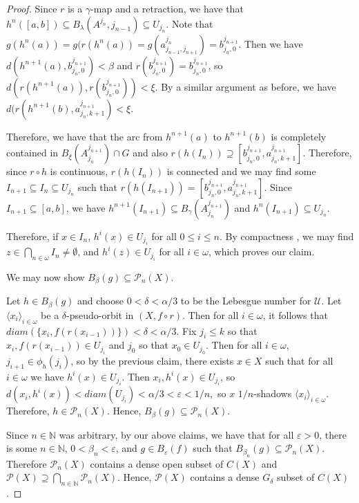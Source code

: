 \documentclass{amsart}
\numberwithin{equation}{section}
\begin{document}
\begin{proof}
Since $r$ is a $\gamma$-map and a retraction, we have that $h^n([a,b])\subseteq B_\lambda(A^{j_n},{j_{n-1}})\subseteq U_{j_n}$. Note that $g(h^n(a))= g(r(h^n(a))= g(a^{j_n}_{j_{n-1}, j_{n+1}})= b^{j_{n+1}}_{j_{n},0}.$ Then we have $d(h^{n+1}(a), b^{j_{n+1}}_{j_{n},0})<\beta$ and $r(b^{j_{n+1}}_{j_{n},0})=b^{j_{n+1}}_{j_{n},0}$, so $d(r(h^{n+1}(a)),r(b^{j_{n+1}}_{j_{n},0}))<\xi$. By a similar argument as before, we have $d(r(h^{n+1}(b), a^{j_{n+1}}_{j_{n},k+1})<\xi.$ 

Therefore, we have that the arc from $h^{n+1}(a)$ to $h^{n+1}(b)$ is completely contained in $B_\xi (A^{j_{n+1}}_{j_n})\cap G$ and also $r(h(I_n))\supseteq [b^{j_{n+1}}_{j_{n},0},a^{j_{n+1}}_{j_{n},k+1}]$. Therefore, since $r\circ h$ is continuous, $r(h(I_n))$ is connected and we may find some $I_{n+1}\subseteq I_n\subseteq U_{j_n}$ such that $r(h(I_{n+1}))= [b^{j_{n+1}}_{j_{n},0},a^{j_{n+1}}_{j_{n},k+1}]$. Since $I_{n+1}\subseteq[a,b]$, we have $h^{n+1}(I_{n+1})\subseteq B_\gamma(A^{j_{n+1}}_{j_n})$ and $h^n(I_{n+1})\subseteq U_{j_n}.$


Therefore, if $x\in I_n$, $h^i(x)\in U_{j_i}$ for all $0\leq i\leq n$. By compactness , we may find $z\in \bigcap_{n\in \omega}I_n \neq \emptyset$, and $h^i(z)\in U_{j_i} $ for all $i\in \omega$, which proves our claim. 


We may now show $B_\beta(g)\subseteq \mathcal{P}_n(X)$.

Let $h\in B_\beta(g)$ and choose $0<\delta<\alpha/3$ to be the Lebesgue number for $\mathcal{U}$. Let $\langle x_i \rangle _{i\in \omega}$ be a $\delta$-pseudo-orbit in $(X,f\circ r)$. Then for all $i\in \omega$, it follows that $diam(\{x_i, f(r(x_{i-1})) \})<\delta<\alpha/3.$ Fix $j_i\leq k$ so that $x_i,f(r(x_{i-1}))\in U_{j_i}$ and $j_0$ so that $x_0\in U_{j_0}$. Then for all $i \in \omega$, $j_{i+1}\in \phi_h(j_i)$, so by the previous claim, there exists $x\in X$ such that for all $i\in \omega$ we have $h^i(x)\in U_{j_i}.$ Then $x_i,h^i(x)\in U_{j_i}$, so $d(x_i,h^i(x))<diam(U_{j_i})<\alpha/3<\varepsilon<1/n,$ so $x$ $1/n$-shadows $\langle x_i \rangle _{i\in \omega}$. Therefore, $h\in \mathcal{P}_n(X).$ Hence, $B_\beta(g)\subseteq \mathcal{P}_n(X)$.


Since $n\in \mathbb N$ was arbitrary, by our above claims, we have that for all $\varepsilon>0$, there is some $n\in \mathbb N$, $0<\beta_n<\varepsilon$, and $g\in B_\varepsilon(f)$ such that $ B_{\beta_n}(g)\subseteq \mathcal{P}_n(X)$. Therefore $\mathcal{P}_n(X)$ contains a dense open subset of $C(X)$ and $\mathcal{P}(X)\supseteq \bigcap_{n\in \mathbb N}\mathcal{P}_n(X). $ Hence, $\mathcal{P}(X)$ contains a dense $G_\delta$ subset of $C(X)$.



\end{proof}
\end{document}
